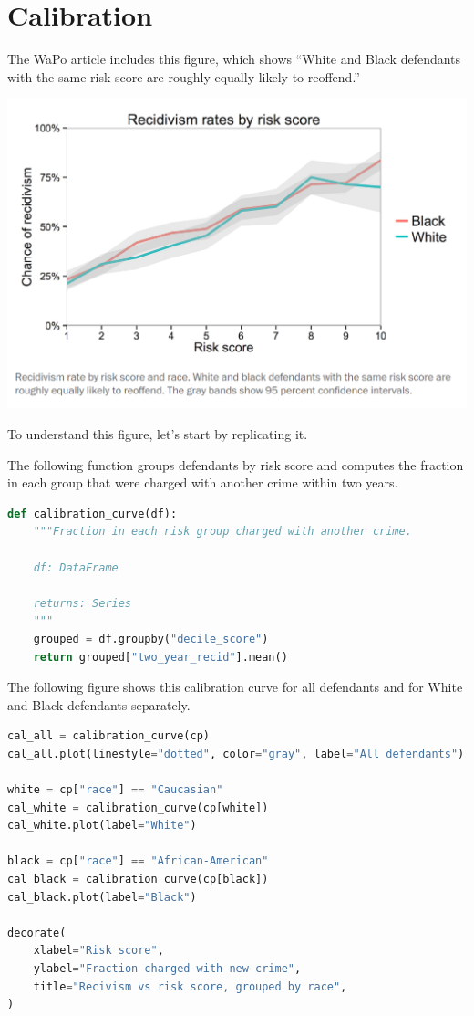 \section{Calibration}\label{calibration}

The WaPo article includes this figure, which shows ``White and Black
defendants with the same risk score are roughly equally likely to
reoffend.''

\includegraphics{chapters/figs/calibration1.png}

To understand this figure, let's start by replicating it.

The following function groups defendants by risk score and computes the
fraction in each group that were charged with another crime within two
years.

\begin{lstlisting}[language=Python,style=source]
def calibration_curve(df):
    """Fraction in each risk group charged with another crime.

    df: DataFrame

    returns: Series
    """
    grouped = df.groupby("decile_score")
    return grouped["two_year_recid"].mean()
\end{lstlisting}

The following figure shows this calibration curve for all defendants and
for White and Black defendants separately.

\begin{lstlisting}[language=Python,style=source]
cal_all = calibration_curve(cp)
cal_all.plot(linestyle="dotted", color="gray", label="All defendants")

white = cp["race"] == "Caucasian"
cal_white = calibration_curve(cp[white])
cal_white.plot(label="White")

black = cp["race"] == "African-American"
cal_black = calibration_curve(cp[black])
cal_black.plot(label="Black")

decorate(
    xlabel="Risk score",
    ylabel="Fraction charged with new crime",
    title="Recivism vs risk score, grouped by race",
)
\end{lstlisting}

